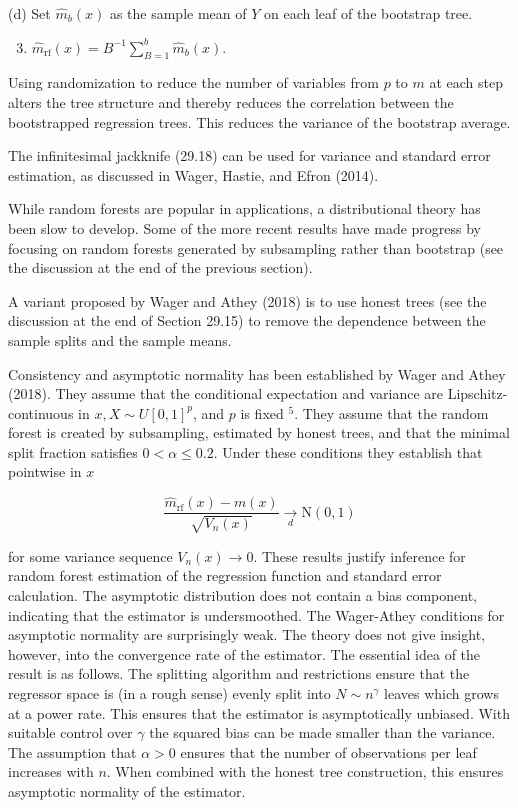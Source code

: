 \documentclass[10pt]{article}
\begin{document}
(d) Set $\widehat{m}_{b}(x)$ as the sample mean of $Y$ on each leaf of the bootstrap tree.

\begin{enumerate}
  \setcounter{enumi}{2}
  \item $\widehat{m}_{\mathrm{rf}}(x)=B^{-1} \sum_{B=1}^{b} \widehat{m}_{b}(x)$.
\end{enumerate}

Using randomization to reduce the number of variables from $p$ to $m$ at each step alters the tree structure and thereby reduces the correlation between the bootstrapped regression trees. This reduces the variance of the bootstrap average.

The infinitesimal jackknife (29.18) can be used for variance and standard error estimation, as discussed in Wager, Hastie, and Efron (2014).

While random forests are popular in applications, a distributional theory has been slow to develop. Some of the more recent results have made progress by focusing on random forests generated by subsampling rather than bootstrap (see the discussion at the end of the previous section).

A variant proposed by Wager and Athey (2018) is to use honest trees (see the discussion at the end of Section 29.15) to remove the dependence between the sample splits and the sample means.

Consistency and asymptotic normality has been established by Wager and Athey (2018). They assume that the conditional expectation and variance are Lipschitz-continuous in $x, X \sim U[0,1]^{p}$, and $p$ is fixed ${ }^{5}$. They assume that the random forest is created by subsampling, estimated by honest trees, and that the minimal split fraction satisfies $0<\alpha \leq 0.2$. Under these conditions they establish that pointwise in $x$

$$
\frac{\widehat{m}_{\mathrm{rf}}(x)-m(x)}{\sqrt{V_{n}(x)}} \underset{d}{\longrightarrow} \mathrm{N}(0,1)
$$

for some variance sequence $V_{n}(x) \rightarrow 0$. These results justify inference for random forest estimation of the regression function and standard error calculation. The asymptotic distribution does not contain a bias component, indicating that the estimator is undersmoothed. The Wager-Athey conditions for asymptotic normality are surprisingly weak. The theory does not give insight, however, into the convergence rate of the estimator. The essential idea of the result is as follows. The splitting algorithm and restrictions ensure that the regressor space is (in a rough sense) evenly split into $N \sim n^{\gamma}$ leaves which grows at a power rate. This ensures that the estimator is asymptotically unbiased. With suitable control over $\gamma$ the squared bias can be made smaller than the variance. The assumption that $\alpha>0$ ensures that the number of observations per leaf increases with $n$. When combined with the honest tree construction, this ensures asymptotic normality of the estimator.
\end{document}
